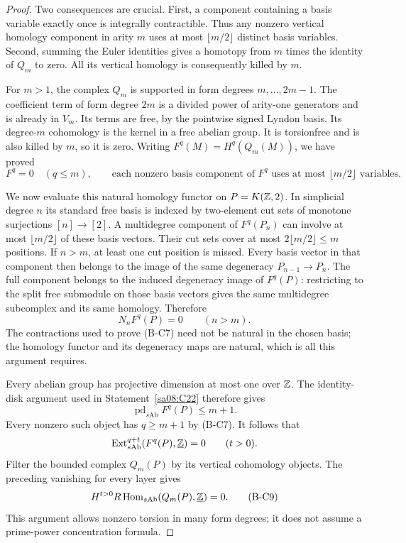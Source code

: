 \begin{proof}
Two consequences are crucial.
First, a component containing a
basis variable exactly once is
integrally contractible. Thus any
nonzero vertical homology component
in arity $m$ uses at most
$\lfloor m/2\rfloor$ distinct
basis variables. Second, summing
the Euler identities gives a
homotopy from $m$ times the identity
of $Q_m$ to zero. All its vertical
homology is consequently killed
by $m$.

For $m>1$, the complex $Q_m$ is
supported in form degrees
$m,\ldots,2m-1$. The coefficient
term of form degree $2m$ is a
divided power of arity-one
generators and is already in $V_m$.
Its terms are free, by the
pointwise signed Lyndon basis.
Its degree-$m$ cohomology is the
kernel in a free abelian group.
It is torsionfree and is also
killed by $m$, so it is zero.
Writing $F^q(M)=H^q(Q_m(M))$, we
have proved
\begin{equation}
 F^q=0\quad(q\leq m),\qquad
 \text{each nonzero basis component of }F^q
 \text{ uses at most }\lfloor m/2\rfloor
 \text{ variables}.
 \tag{B-C7}
\end{equation}

We now evaluate this natural homology
functor on $P=K(\mathbb Z,2)$. In simplicial
degree $n$ its standard free basis
is indexed by two-element cut sets
of monotone surjections $[n]\to[2]$.
A multidegree component of $F^q(P_n)$
can involve at most
$\lfloor m/2\rfloor$ of these basis
vectors. Their cut sets cover at
most $2\lfloor m/2\rfloor\leq m$
positions. If $n>m$, at least one
cut position is missed. Every
basis vector in that component
then belongs to the image of the
same degeneracy $P_{n-1}\to P_n$.
The full component belongs to
the induced degeneracy image of
$F^q(P)$: restricting to the
split free submodule on those
basis vectors gives the same
multidegree subcomplex and its
same homology.
Therefore
\begin{equation}
 N_nF^q(P)=0\qquad(n>m).
 \tag{B-C8}
\end{equation}
The contractions used to prove
(B-C7) need not be natural in
the chosen basis; the homology
functor and its degeneracy maps
are natural, which is all this
argument requires.

Every abelian group has projective
dimension at most one over $\mathbb Z$.
The identity-disk argument used
in Statement~\ref{sa08:C22}
therefore gives
\[
 \operatorname{pd}_{s\mathrm{Ab}}F^q(P)
 \leq m+1.
\]
Every nonzero such object has
$q\geq m+1$ by (B-C7).
It follows that
\[
 \operatorname{Ext}^{q+t}_{s\mathrm{Ab}}
       (F^q(P),\underline{\mathbb Z})=0
       \qquad(t>0).
\]
Filter the bounded complex $Q_m(P)$
by its vertical cohomology objects.
The preceding vanishing for every
layer gives
\begin{equation}
 H^{t>0}R\operatorname{Hom}_{s\mathrm{Ab}}
       (Q_m(P),\underline{\mathbb Z})=0.
 \tag{B-C9}
\end{equation}
This argument allows nonzero
torsion in many form degrees;
it does not assume a prime-power
concentration formula.


\end{proof}
